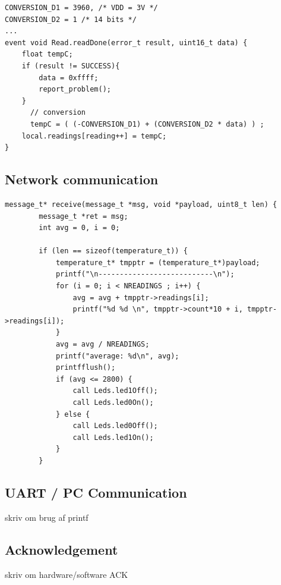 \begin{lstlisting}
CONVERSION_D1 = 3960, /* VDD = 3V */
CONVERSION_D2 = 1 /* 14 bits */
...
event void Read.readDone(error_t result, uint16_t data) {
	float tempC;
	if (result != SUCCESS){
		data = 0xffff;
		report_problem();
	}
	  // conversion
	  tempC = ( (-CONVERSION_D1) + (CONVERSION_D2 * data) ) ;
    local.readings[reading++] = tempC;
}
\end{lstlisting}


\subsection{Network communication}

\begin{lstlisting}
message_t* receive(message_t *msg, void *payload, uint8_t len) {
		message_t *ret = msg;
		int avg = 0, i = 0;

		if (len == sizeof(temperature_t)) {
			temperature_t* tmpptr = (temperature_t*)payload;
			printf("\n---------------------------\n");
			for (i = 0; i < NREADINGS ; i++) {
				avg = avg + tmpptr->readings[i];
				printf("%d %d \n", tmpptr->count*10 + i, tmpptr->readings[i]);
			}
			avg = avg / NREADINGS;
			printf("average: %d\n", avg);
			printfflush();
			if (avg <= 2800) {
				call Leds.led1Off();
				call Leds.led0On();
			} else {
				call Leds.led0Off();
				call Leds.led1On();
			}
		}
\end{lstlisting}

\subsection{UART / PC Communication}
skriv om brug af printf

\subsection{Acknowledgement}
skriv om hardware/software ACK
